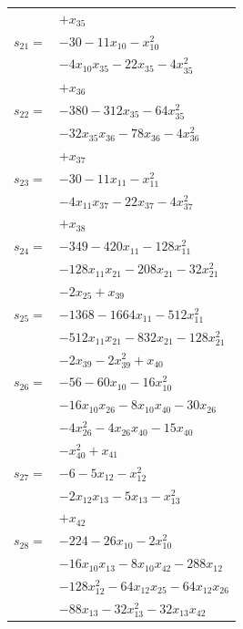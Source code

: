 \begin{longtable}{@{}r@{\;}l@{}}
 & \(\displaystyle +x_{35}\) \\[3pt]
\(s_{21}=\) & \(\displaystyle -30 -11x_{10} -x_{10}^{2}\) \\
 & \(\displaystyle -4x_{10}x_{35} -22x_{35} -4x_{35}^{2}\) \\
 & \(\displaystyle +x_{36}\) \\[3pt]
\(s_{22}=\) & \(\displaystyle -380 -312x_{35} -64x_{35}^{2}\) \\
 & \(\displaystyle -32x_{35}x_{36} -78x_{36} -4x_{36}^{2}\) \\
 & \(\displaystyle +x_{37}\) \\[3pt]
\(s_{23}=\) & \(\displaystyle -30 -11x_{11} -x_{11}^{2}\) \\
 & \(\displaystyle -4x_{11}x_{37} -22x_{37} -4x_{37}^{2}\) \\
 & \(\displaystyle +x_{38}\) \\[3pt]
\(s_{24}=\) & \(\displaystyle -349 -420x_{11} -128x_{11}^{2}\) \\
 & \(\displaystyle -128x_{11}x_{21} -208x_{21} -32x_{21}^{2}\) \\
 & \(\displaystyle -2x_{25} +x_{39}\) \\[3pt]
\(s_{25}=\) & \(\displaystyle -1368 -1664x_{11} -512x_{11}^{2}\) \\
 & \(\displaystyle -512x_{11}x_{21} -832x_{21} -128x_{21}^{2}\) \\
 & \(\displaystyle -2x_{39} -2x_{39}^{2} +x_{40}\) \\[3pt]
\(s_{26}=\) & \(\displaystyle -56 -60x_{10} -16x_{10}^{2}\) \\
 & \(\displaystyle -16x_{10}x_{26} -8x_{10}x_{40} -30x_{26}\) \\
 & \(\displaystyle -4x_{26}^{2} -4x_{26}x_{40} -15x_{40}\) \\
 & \(\displaystyle -x_{40}^{2} +x_{41}\) \\[3pt]
\(s_{27}=\) & \(\displaystyle -6 -5x_{12} -x_{12}^{2}\) \\
 & \(\displaystyle -2x_{12}x_{13} -5x_{13} -x_{13}^{2}\) \\
 & \(\displaystyle +x_{42}\) \\[3pt]
\(s_{28}=\) & \(\displaystyle -224 -26x_{10} -2x_{10}^{2}\) \\
 & \(\displaystyle -16x_{10}x_{13} -8x_{10}x_{42} -288x_{12}\) \\
 & \(\displaystyle -128x_{12}^{2} -64x_{12}x_{25} -64x_{12}x_{26}\) \\
 & \(\displaystyle -88x_{13} -32x_{13}^{2} -32x_{13}x_{42}\) \\

\end{longtable}
